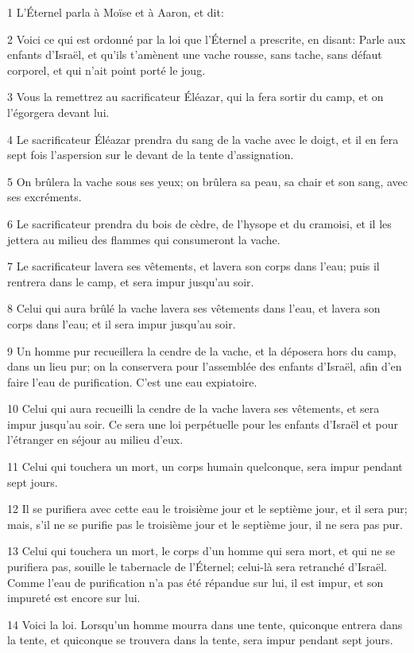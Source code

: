 \par 1 L'Éternel parla à Moïse et à Aaron, et dit:
\par 2 Voici ce qui est ordonné par la loi que l'Éternel a prescrite, en disant: Parle aux enfants d'Israël, et qu'ils t'amènent une vache rousse, sans tache, sans défaut corporel, et qui n'ait point porté le joug.
\par 3 Vous la remettrez au sacrificateur Éléazar, qui la fera sortir du camp, et on l'égorgera devant lui.
\par 4 Le sacrificateur Éléazar prendra du sang de la vache avec le doigt, et il en fera sept fois l'aspersion sur le devant de la tente d'assignation.
\par 5 On brûlera la vache sous ses yeux; on brûlera sa peau, sa chair et son sang, avec ses excréments.
\par 6 Le sacrificateur prendra du bois de cèdre, de l'hysope et du cramoisi, et il les jettera au milieu des flammes qui consumeront la vache.
\par 7 Le sacrificateur lavera ses vêtements, et lavera son corps dans l'eau; puis il rentrera dans le camp, et sera impur jusqu'au soir.
\par 8 Celui qui aura brûlé la vache lavera ses vêtements dans l'eau, et lavera son corps dans l'eau; et il sera impur jusqu'au soir.
\par 9 Un homme pur recueillera la cendre de la vache, et la déposera hors du camp, dans un lieu pur; on la conservera pour l'assemblée des enfants d'Israël, afin d'en faire l'eau de purification. C'est une eau expiatoire.
\par 10 Celui qui aura recueilli la cendre de la vache lavera ses vêtements, et sera impur jusqu'au soir. Ce sera une loi perpétuelle pour les enfants d'Israël et pour l'étranger en séjour au milieu d'eux.
\par 11 Celui qui touchera un mort, un corps humain quelconque, sera impur pendant sept jours.
\par 12 Il se purifiera avec cette eau le troisième jour et le septième jour, et il sera pur; mais, s'il ne se purifie pas le troisième jour et le septième jour, il ne sera pas pur.
\par 13 Celui qui touchera un mort, le corps d'un homme qui sera mort, et qui ne se purifiera pas, souille le tabernacle de l'Éternel; celui-là sera retranché d'Israël. Comme l'eau de purification n'a pas été répandue sur lui, il est impur, et son impureté est encore sur lui.
\par 14 Voici la loi. Lorsqu'un homme mourra dans une tente, quiconque entrera dans la tente, et quiconque se trouvera dans la tente, sera impur pendant sept jours.
